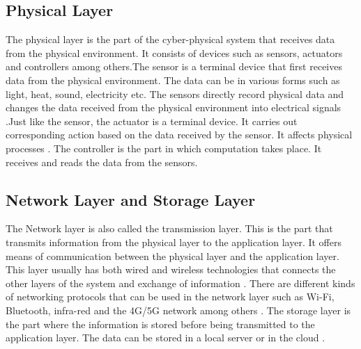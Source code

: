 \documentclass[english]{lni}
\begin{document}
\subsection{Physical Layer}
The physical layer is the part of the cyber-physical system that receives data from the physical environment. It consists of devices such as sensors, actuators and controllers among others.The sensor is a terminal device that first receives data from the physical environment. The data can be in various forms such as light, heat, sound, electricity etc. The sensors directly record physical data and changes the data received from the physical environment into electrical signals \cite{copyurl3}.Just like the sensor, the actuator is a terminal device. It carries out corresponding action based on the data received by the sensor. It affects physical processes \cite{copyurl3}. The controller is the part in which computation takes place. It receives and reads the data from the sensors.

\subsection{Network Layer and Storage Layer}
The Network layer is also called the transmission layer. This is the part that transmits information from the physical layer to the application layer. It offers means of communication between the physical layer and the application layer. This layer usually has both wired and wireless technologies that connects the other layers of the system and exchange of information \cite{b1}. There are different kinds of networking protocols that can be used in the network layer such as Wi-Fi, Bluetooth, infra-red and the 4G/5G network among others \cite{image2}.
The storage layer is the part where the information is stored before being transmitted to the application layer. The data can be stored in a local server or in the cloud \cite{image2}.


\end{document}
